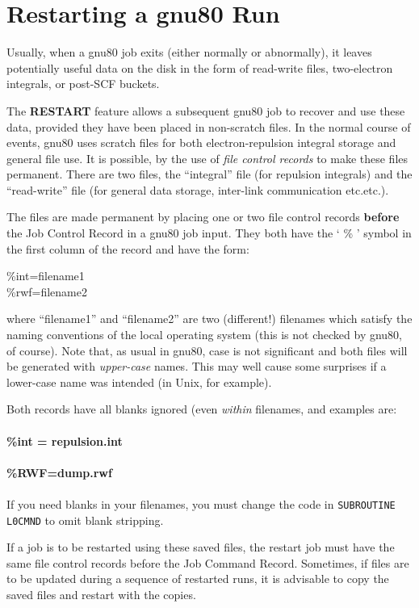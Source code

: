 
\section{Restarting a gnu80 Run}
\label{restart}
Usually, when a gnu80 job exits (either normally or abnormally), it
leaves potentially useful data on the disk in the form of read-write
files, two-electron integrals,  or post-SCF buckets.  

The {\bf RESTART}
feature allows a subsequent gnu80 job to recover and use these data,
provided they have been placed in non-scratch files. In the normal course
of events, gnu80 uses scratch files for both electron-repulsion
integral storage and general file use. It is possible, by the
use of {\em file control records} to make these files permanent.
There are two files, the ``integral'' file (for repulsion
integrals) and the ``read-write'' file (for general data
storage, inter-link communication etc.etc.).

The files are made permanent by placing one or two file control records
{\bf before} the Job Control Record in a gnu80 job input.
They both have the ` \% ' symbol in the first column of the record
and have the form:
\begin{description}
\item[\%int=filename1] 
\item[\%rwf=filename2] 
\end{description}
where ``filename1'' and ``filename2''
are two (different!) filenames which satisfy the naming conventions of
the local operating system (this is not checked by gnu80, of course).
Note that, as usual in gnu80, case is not significant and both files
will be generated with {\em upper-case} names. This may well cause
some surprises if a lower-case name was intended (in Unix, for example).

Both records have all blanks ignored (even {\em within} filenames, 
and examples are: \\
\ \\
{\bf \%int = repulsion.int} \\
\ \\
{\bf \%RWF=dump.rwf}
\ \\
\ \\
If you need blanks in your filenames, you must change the code
in {\tt SUBROUTINE L0CMND} to omit blank stripping.

If a job is to be restarted
using these saved files, the restart job must
have the same file control records
before the Job Command Record.
Sometimes, if files are to be updated during a sequence
of restarted runs, it is advisable to
copy the saved files and restart with the copies.

